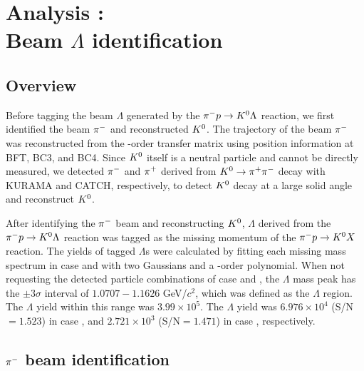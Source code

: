%

\graphicspath{{./pictures/chapter_Lbeam/}}

\chapter{Analysis : \\Beam $\Lambda$ identification} 
\label{chap-Lbeam}

\section{Overview}
\label{sec-overview}
Before tagging the beam $\Lambda$ generated by the $\pi^- p \to K^0 \Lambda$ reaction, we first identified the beam $\pi^{-}$ and reconstructed $K^{0}$. The trajectory of the beam $\pi^{-}$ was reconstructed from the -order transfer matrix using position information at BFT, BC3, and BC4. Since $K^{0}$ itself is a neutral particle and cannot be directly measured, we detected $\pi^{-}$ and $\pi^{+}$ derived from $K^0 \to \pi^+ \pi^-$ decay with KURAMA and CATCH, respectively, to detect $K^{0}$ decay at a large solid angle and reconstruct $K^{0}$.

After identifying the $\pi^{-}$ beam and reconstructing $K^{0}$, $\Lambda$ derived from the $\pi^- p \to K^0 \Lambda$ reaction was tagged as the missing momentum of the $\pi^- p \to K^0 X$ reaction. The yields of tagged $\Lambda$s were calculated by fitting each missing mass spectrum in case  and  with two Gaussians and a -order polynomial. When not requesting the detected particle combinations of case  and , the $\Lambda$ mass peak has the $\pm3\sigma$ interval of $1.0707 - 1.1626$ GeV/$c^{2}$, which was defined as the $\Lambda$ region. The $\Lambda$ yield within this range was $3.99\times10^{5}$. The $\Lambda$ yield was $6.976\times10^{4}$ (S/N$=1.523$) in case , and $2.721\times10^{3}$ (S/N$=1.471$) in case , respectively. %

\section{$\pi^{-}$ beam identification}
